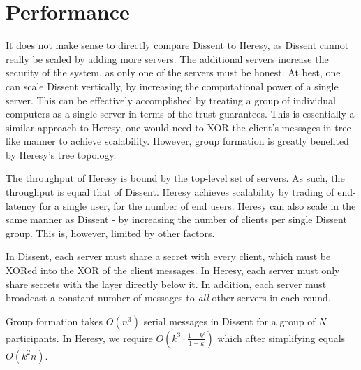 \section{Performance}

It does not make sense to directly compare Dissent to Heresy, as Dissent cannot really be scaled by adding more servers. The additional servers increase the security of the system, as only one of the servers must be honest. At best, one can scale Dissent vertically, by increasing the computational power of a single server. This can be effectively accomplished by treating a group of individual computers as a single server in terms of the trust guarantees. This is essentially a similar approach to Heresy, one would need to XOR the client's messages in tree like manner to achieve scalability. However, group formation is greatly benefited  by Heresy's tree topology.

The throughput of Heresy is bound by the top-level set of servers. As such,
the throughput is equal that of Dissent. Heresy achieves scalability by trading of end-latency for a single user, for the number of end users. Heresy can also scale in the same manner as Dissent - by increasing the number of clients per single Dissent group. This is, however, limited by other factors.

In Dissent, each server must share a secret with every client, which must be XORed into the XOR of the client messages. In Heresy, each server must only share secrets with the layer directly below it. In addition, each server must broadcast a constant number of messages to \emph{all} other servers in each round. 
 
Group formation takes $O(n^3)$ serial messages in Dissent for a group of $N$ participants. In Heresy, we require $O(k^3 \cdot \frac{1-k^l}{1-k})$ which after simplifying equals $O(k^2n)$. 




